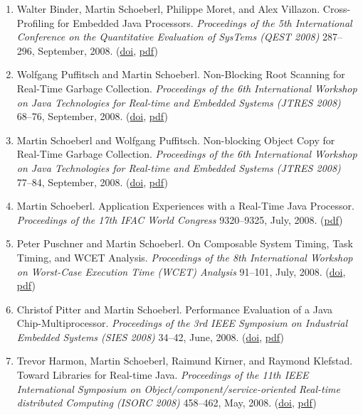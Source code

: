 \begin{enumerate}
\item Walter Binder, Martin Schoeberl, Philippe Moret, and Alex Villazon.
 Cross-Profiling for Embedded Java Processors.
 \emph{Proceedings of the 5th International Conference on the Quantitative Evaluation of SysTems (QEST 2008)} 287--296, September, 2008.
(\href{http://dx.doi.org/10.1109/QEST.2008.39}{doi}, \href{http://www.jopdesign.com/doc/crossprofiling_qest2008.pdf}{pdf})

\item Wolfgang Puffitsch and Martin Schoeberl.
 Non-Blocking Root Scanning for Real-Time Garbage Collection.
 \emph{Proceedings of the 6th International Workshop on Java Technologies for Real-time and Embedded Systems (JTRES 2008)} 68--76, September, 2008.
(\href{http://dx.doi.org/10.1145/1434790.1434801}{doi}, \href{http://www.jopdesign.com/doc/nbrs.pdf}{pdf})

\item Martin Schoeberl and Wolfgang Puffitsch.
 Non-blocking Object Copy for Real-Time Garbage Collection.
 \emph{Proceedings of the 6th International Workshop on Java Technologies for Real-time and Embedded Systems (JTRES 2008)} 77--84, September, 2008.
(\href{http://dx.doi.org/10.1145/1434790.1434802}{doi}, \href{http://www.jopdesign.com/doc/gchwcp.pdf}{pdf})

\item Martin Schoeberl.
 Application Experiences with a Real-Time Java Processor.
 \emph{Proceedings of the 17th IFAC World Congress} 9320--9325, July, 2008.
(\href{http://www.jopdesign.com/doc/jop_app.pdf}{pdf})

\item Peter Puschner and Martin Schoeberl.
 On Composable System Timing, Task Timing, and WCET Analysis.
 \emph{Proceedings of the 8th International Workshop on Worst-Case Execution Time (WCET) Analysis} 91--101, July, 2008.
(\href{http://dx.doi.org/10.4230/LIPIcs.STACS.2008.1378}{doi}, \href{http://www.jopdesign.com/doc/wcet2008.pdf}{pdf})

\item Christof Pitter and Martin Schoeberl.
 Performance Evaluation of a Java Chip-Multiprocessor.
 \emph{Proceedings of the 3rd IEEE Symposium on Industrial Embedded Systems (SIES 2008)} 34--42, June, 2008.
(\href{http://dx.doi.org/10.1109/SIES.2008.4577678}{doi}, \href{http://www.jopdesign.com/doc/cmpeval_sies2008.pdf}{pdf})

\item Trevor Harmon, Martin Schoeberl, Raimund Kirner, and Raymond Klefstad.
 Toward Libraries for Real-time Java.
 \emph{Proceedings of the 11th IEEE International Symposium on Object/component/service-oriented Real-time distributed Computing (ISORC 2008)} 458--462, May, 2008.
(\href{http://dx.doi.org/10.1109/ISORC.2008.73}{doi}, \href{http://www.jopdesign.com/doc/rtlib_isorc2008.pdf}{pdf})


\end{enumerate}
